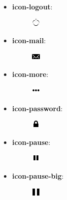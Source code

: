 \documentclass[letterpaper,10pt,english]{sphinxmanual}
\begin{document}
\begin{itemize}
\begin{description}
\end{description}

\item {} \begin{description}
\item[{\textbf{icon-logout}:}] \leavevmode
\includegraphics{logout.png}

\end{description}

\item {} \begin{description}
\item[{\textbf{icon-mail}:}] \leavevmode
\includegraphics{mail.png}

\end{description}

\item {} \begin{description}
\item[{\textbf{icon-more}:}] \leavevmode
\includegraphics{more.png}

\end{description}

\item {} \begin{description}
\item[{\textbf{icon-password}:}] \leavevmode
\includegraphics{password.png}

\end{description}

\item {} \begin{description}
\item[{\textbf{icon-pause}:}] \leavevmode
\includegraphics{pause.png}

\end{description}

\item {} \begin{description}
\item[{\textbf{icon-pause-big}:}] \leavevmode
\includegraphics{pause-big.png}


\end{description}
\end{itemize}
\end{document}
